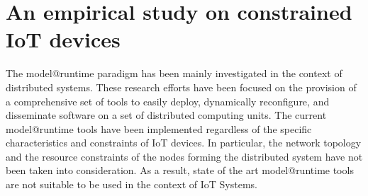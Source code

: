 




\section{An empirical study on constrained IoT devices}
The model@runtime paradigm has been mainly investigated in the context of distributed systems. 
These research efforts have been focused on the provision of a comprehensive set of tools to easily deploy, dynamically reconfigure, and disseminate software on a set of distributed computing units.
The current model@runtime tools have been implemented regardless of the specific characteristics and constraints of IoT devices.
In particular, the network topology and the resource constraints of the nodes forming the distributed system have not been taken into consideration.
As a result, state of the art model@runtime tools are not suitable to be used in the context of IoT Systems.

